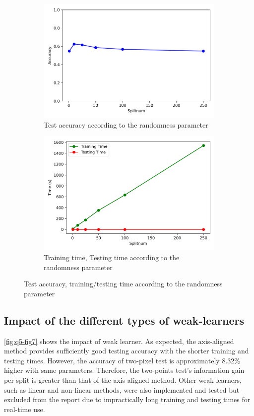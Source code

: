 \begin{figure}[htbp]
	\centering
	\begin{subfigure}[t]{0.4\linewidth}
		\centering
		\includegraphics[width=\linewidth]{image/q5-fig4.png}
		\caption{Test accuracy according to the randomness parameter}
		\label{fig:q5-fig4}
	\end{subfigure}%
	\quad
	\begin{subfigure}[t]{0.4\linewidth}
		\centering
		\includegraphics[width=\linewidth]{image/q5-fig5.png}
		\caption{Training time, Testing time according to the randomness parameter}
		\label{fig:q5-fig5}
	\end{subfigure}
	\caption{Test accuracy, training/testing time according to the randomness parameter}
\end{figure}


\subsection{Impact of the different types of weak-learners}
\cref{fig:q5-fig7} shows the impact of weak learner. As expected, the axis-aligned method provides sufficiently good testing accuracy with the shorter training and testing times. However, the accuracy of two-pixel test is approximately 8.32\% higher with same parameters. Therefore, the two-points test's information gain per split is greater than that of the axis-aligned method. Other weak learners, such as linear and non-linear methods, were also implemented and tested but excluded from the report due to impractically long training and testing times for real-time use.


